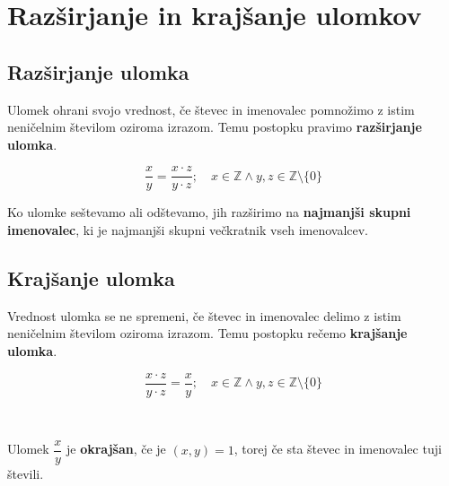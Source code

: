 
    \section{Razširjanje in krajšanje ulomkov}

        

            \subsection*{Razširjanje ulomka}
                Ulomek ohrani svojo vrednost, če števec in imenovalec pomnožimo z istim neničelnim številom oziroma izrazom.
                Temu postopku pravimo \textbf{razširjanje ulomka}.

                $$\dfrac{x}{y}=\dfrac{x\cdot z}{y\cdot z}; \quad x\in\mathbb{Z} \land y,z\in\mathbb{Z}\setminus\{0\}$$
            

            
                Ko ulomke seštevamo ali odštevamo, jih razširimo na \textbf{najmanjši skupni imenovalec}, 
                ki je najmanjši skupni večkratnik vseh imenovalcev.
            

        

        
            \subsection*{Krajšanje ulomka}
                Vrednost ulomka se ne spremeni, če števec in imenovalec delimo z istim neničelnim številom oziroma izrazom.
                Temu postopku rečemo \textbf{krajšanje ulomka}.

                $$\dfrac{x\cdot z}{y\cdot z}=\dfrac{x}{y}; \quad x\in\mathbb{Z}\land y,z\in\mathbb{Z}\setminus\{0\} $$
            
                ~

                Ulomek $\dfrac{x}{y}$ je \textbf{okrajšan}, če je $(x,y)=1$, torej če sta števec in imenovalec tuji števili.
            
        
            ~\\


